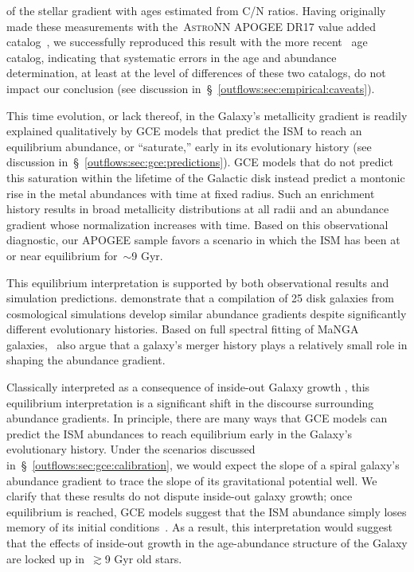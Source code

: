 of the stellar gradient with ages estimated from C/N ratios.
Having originally made these measurements with the~\textsc{AstroNN} APOGEE DR17
value added catalog~\citep{Mackereth2019b}, we successfully reproduced this
result with the more recent~\citet{Leung2023} age catalog, indicating that
systematic errors in the age and abundance determination, at least at the level
of differences of these two catalogs, do not impact our conclusion (see
discussion in~\S~\ref{outflows:sec:empirical:caveats}).
\par
This time evolution, or lack thereof, in the Galaxy's metallicity gradient
is readily explained qualitatively by GCE models that predict the ISM to reach
an equilibrium abundance, or ``saturate,'' early in its evolutionary history
(see discussion in~\S~\ref{outflows:sec:gce:predictions}).
GCE models that do not predict this saturation within the lifetime of the
Galactic disk instead predict a montonic rise in the metal abundances with time
at fixed radius.
Such an enrichment history results in broad metallicity distributions at all
radii and an abundance gradient whose normalization increases with time.
Based on this observational diagnostic, our APOGEE sample favors a scenario
in which the ISM has been at or near equilibrium for~$\sim$9 Gyr.
\par
This equilibrium interpretation is supported by both observational results and
simulation predictions.
\citet{Pilkington2012} demonstrate that a compilation of 25 disk galaxies from
cosmological simulations develop similar abundance gradients despite
significantly different evolutionary histories.
Based on full spectral fitting of MaNGA galaxies,~\citet{Goddard2017} also
argue that a galaxy's merger history plays a relatively small role in shaping
the abundance gradient.
\par
Classically interpreted as a consequence of inside-out Galaxy growth
\citep{Kauffmann1996}, this equilibrium interpretation is a significant shift
in the discourse surrounding abundance gradients.
In principle, there are many ways that GCE models can predict the ISM
abundances to reach equilibrium early in the Galaxy's evolutionary history.
Under the scenarios discussed in~\S~\ref{outflows:sec:gce:calibration}, we
would expect the slope of a spiral galaxy's abundance gradient to trace the
slope of its gravitational potential well.
We clarify that these results do not dispute inside-out galaxy growth; once
equilibrium is reached, GCE models suggest that the ISM abundance simply loses
memory of its initial conditions~\citep[see, e.g.,][]{Weinberg2017b}.
As a result, this interpretation would suggest that the effects of inside-out
growth in the age-abundance structure of the Galaxy are locked up
in~$\gtrsim$9 Gyr old stars.

